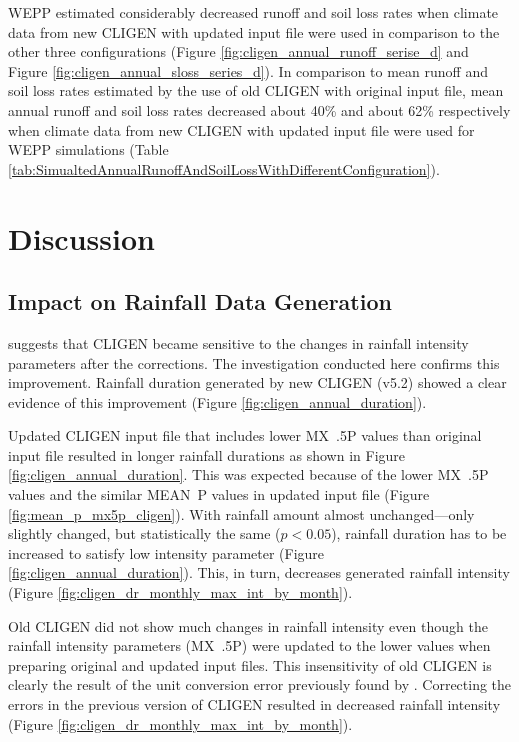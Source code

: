 WEPP estimated considerably decreased runoff and soil loss rates when climate
data from new CLIGEN with updated input file were used in comparison to the
other three configurations (Figure \ref{fig:cligen_annual_runoff_serise_d} and
Figure \ref{fig:cligen_annual_sloss_series_d}). In comparison to mean runoff and
soil loss rates estimated by the use of old CLIGEN with original input file,
mean annual runoff and soil loss rates decreased about 40\% and about 62\%
respectively when climate data from new CLIGEN with updated input file were used
for WEPP simulations (Table
\ref{tab:SimualtedAnnualRunoffAndSoilLossWithDifferentConfiguration}).

\section{Discussion}
\label{sec:ImprovedCLIGENDiscussion}

\subsection{Impact on Rainfall Data Generation}

\citet{yu2000-301} suggests that CLIGEN became sensitive to the changes in
rainfall intensity parameters after the corrections. The investigation conducted
here confirms this improvement. Rainfall duration generated by new CLIGEN (v5.2)
showed a clear evidence of this improvement (Figure
\ref{fig:cligen_annual_duration}).

Updated CLIGEN input file that includes lower MX~.5P values than original input
file resulted in longer rainfall durations as shown in Figure
\ref{fig:cligen_annual_duration}. This was expected because of the lower MX~.5P
values and the similar MEAN~P values in updated input file (Figure
\ref{fig:mean_p_mx5p_cligen}). With rainfall amount almost unchanged---only
slightly changed, but statistically the same ($p<0.05$), rainfall duration has
to be increased to satisfy low intensity parameter (Figure
\ref{fig:cligen_annual_duration}). This, in turn, decreases generated rainfall
intensity (Figure \ref{fig:cligen_dr_monthly_max_int_by_month}).

Old CLIGEN did not show much changes in rainfall intensity even though the
rainfall intensity parameters (MX~.5P) were updated to the lower values when
preparing original and updated input files. This insensitivity of old CLIGEN is
clearly the result of the unit conversion error previously found by
\citet{yu2000-301}. Correcting the errors in the previous version of CLIGEN
resulted in decreased rainfall intensity (Figure
\ref{fig:cligen_dr_monthly_max_int_by_month}).

